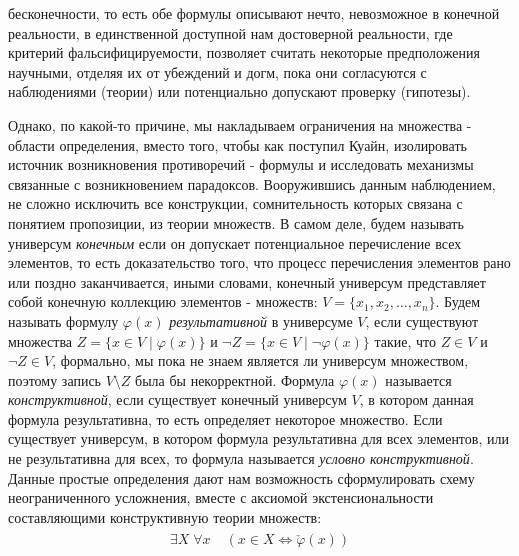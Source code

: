 \documentclass[12pt]{article}
\begin{document}
бесконечности, то есть обе формулы описывают нечто, невозможное в конечной реальности, в единственной доступной нам достоверной реальности, где критерий фальсифицируемости, позволяет считать некоторые предположения научными, отделяя их от убеждений и догм, пока они согласуются с наблюдениями (теории) или потенциально допускают проверку (гипотезы).

Однако, по какой-то причине, мы накладываем ограничения на множества - области определения, вместо того, чтобы как поступил Куайн, изолировать источник возникновения противоречий - формулы и исследовать механизмы связанные с возникновением парадоксов. Вооружившись данным наблюдением, не сложно исключить все конструкции, сомнительность которых связана с понятием пропозиции, из теории множеств. В самом деле, будем называть универсум {\it конечным} если он допускает потенциальное перечисление всех элементов, то есть доказательство того, что процесс перечисления элементов рано или поздно заканчивается, иными словами, конечный универсум представляет собой конечную коллекцию элементов - множеств: $V = \{ x_1, x_2, \dots, x_n \}$. Будем называть формулу $\varphi(x)$ {\it результативной} в универсуме $V$, если существуют множества $Z = \{ x \in V \mid \varphi(x) \}$ и $\neg Z = \{ x \in V \mid \neg\varphi(x) \}$ такие, что $Z \in V$ и $\neg Z \in V$, формально, мы пока не знаем является ли универсум множеством, поэтому запись $V \setminus Z$ была бы некорректной. Формула $\varphi(x)$ называется {\it конструктивной}, если существует конечный универсум $V$, в котором данная формула результативна, то есть определяет некоторое множество. Если существует универсум, в котором формула результативна для всех элементов, или не результативна для всех, то формула называется {\it условно конструктивной}. Данные простые определения дают нам возможность сформулировать схему неограниченного усложнения, вместе с аксиомой экстенсиональности составляющими конструктивную теории множеств:
\begin{align}
\begin{split}
\exists X \; \forall x \; &(x \in X \Leftrightarrow \check{\varphi}(x))\\
\end{split}
\end{align}
\end{document}
